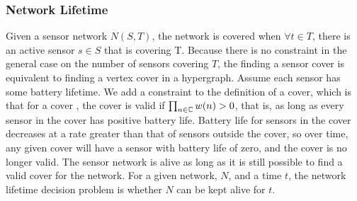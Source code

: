 \subsubsection{Network Lifetime}
\label{sub:net-life}
Given a sensor network $N(S,T)$, the network is covered when $\forall t \in T$, there is an active sensor $s \in S$ that is covering T. Because there is no constraint in the general case on the number of sensors covering $T$, the finding a sensor cover is equivalent to finding a vertex cover in a hypergraph. Assume each sensor has some battery lifetime. We add a constraint to the definition of a cover, which is that for a cover \bCd, the cover is valid if $\prod_{n \in {\mathbb C}} w(n) > 0$, that is, as long as every sensor in the cover has positive battery life. Battery life for sensors in the cover decreases at a rate greater than that of sensors outside the cover, so over time, any given cover will have a sensor with battery life of zero, and the cover is no longer valid. The sensor network is alive as long as it is still possible to find a valid cover for the network. For a given network, $N$, and a time $t$, the network lifetime decision problem is whether $N$ can be kept alive for $t$. 
